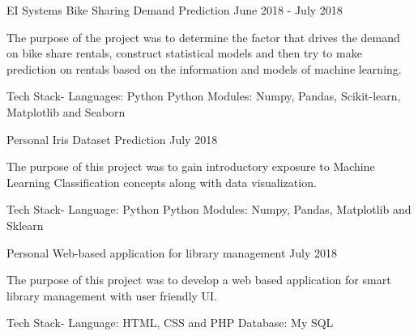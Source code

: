 

\begin{cventries}

  \cventry
    {EI Systems} %
    {Bike Sharing Demand Prediction} %
    {} %
    {June 2018 - July 2018} %
    {
      \begin{cvitems} %
        \item {The purpose of the project was to determine the factor that drives the demand on bike share rentals, construct statistical models and then try to make prediction on rentals based on the information and models of machine learning.}
        \item{Tech Stack- \newline Languages: Python \newline Python Modules: Numpy, Pandas, Scikit-learn, Matplotlib and Seaborn}
      \end{cvitems}
    }


\cventry
    {Personal}
    {Iris Dataset Prediction}
    {}
    {July 2018}
    {
     \begin{cvitems} %
        \item {The purpose of this project was to gain introductory exposure to Machine Learning Classification concepts along with data visualization.}
        \item{Tech Stack- \newline Language: Python \newline Python Modules: Numpy, Pandas, Matplotlib and Sklearn}
      \end{cvitems}
    }
    

\cventry
    {Personal}
    {Web-based application for library management}
    {}
    {July 2018}
    {
     \begin{cvitems} %
        \item {The purpose of this project was to develop a web based application for smart library management with user friendly UI.}
        \item{Tech Stack- \newline Language: HTML, CSS and PHP \newline Database: My SQL}
      \end{cvitems}
    }


\end{cventries}
